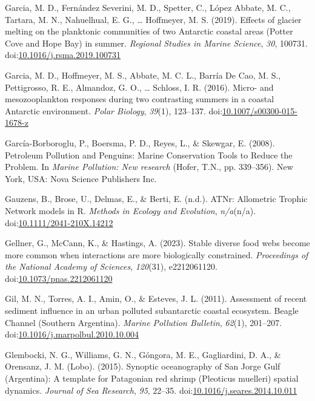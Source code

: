 \documentclass[
]{article}
\newlength{\cslhangindent}
\newenvironment{CSLReferences}[2] %
 {\begin{list}{}{%
  \setlength{\itemindent}{0pt}
  \setlength{\leftmargin}{0pt}
  \setlength{\parsep}{0pt}
  \ifodd #1
   \setlength{\leftmargin}{\cslhangindent}
   \setlength{\itemindent}{-1\cslhangindent}
  \fi
  \setlength{\itemsep}{#2\baselineskip}}}
 {\end{list}}
\begin{document}
\begin{CSLReferences}{1}{0}
Garcia, M. D., Fernández Severini, M. D., Spetter, C., López Abbate, M.
C., Tartara, M. N., Nahuelhual, E. G., \ldots{} Hoffmeyer, M. S. (2019).
Effects of glacier melting on the planktonic communities of two
{Antarctic} coastal areas ({Potter Cove} and {Hope Bay}) in summer.
\emph{Regional Studies in Marine Science}, \emph{30}, 100731.
doi:\href{https://doi.org/10.1016/j.rsma.2019.100731}{10.1016/j.rsma.2019.100731}

Garcia, M. D., Hoffmeyer, M. S., Abbate, M. C. L., Barría De Cao, M. S.,
Pettigrosso, R. E., Almandoz, G. O., \ldots{} Schloss, I. R. (2016).
Micro- and mesozooplankton responses during two contrasting summers in a
coastal {Antarctic} environment. \emph{Polar Biology}, \emph{39}(1),
123--137.
doi:\href{https://doi.org/10.1007/s00300-015-1678-z}{10.1007/s00300-015-1678-z}

García-Borboroglu, P., Boersma, P. D., Reyes, L., \& Skewgar, E. (2008).
Petroleum {Pollution} and {Penguins}: {Marine Conservation Tools} to
{Reduce} the {Problem}. In \emph{Marine {Pollution}: {New} research}
(Hofer, T.N., pp. 339--356). {New York, USA}: {Nova Science Publishers
Inc.}

Gauzens, B., Brose, U., Delmas, E., \& Berti, E. (n.d.). {ATNr}:
{Allometric Trophic Network} models in {R}. \emph{Methods in Ecology and
Evolution}, \emph{n/a}(n/a).
doi:\href{https://doi.org/10.1111/2041-210X.14212}{10.1111/2041-210X.14212}

Gellner, G., McCann, K., \& Hastings, A. (2023). Stable diverse food
webs become more common when interactions are more biologically
constrained. \emph{Proceedings of the National Academy of Sciences},
\emph{120}(31), e2212061120.
doi:\href{https://doi.org/10.1073/pnas.2212061120}{10.1073/pnas.2212061120}

Gil, M. N., Torres, A. I., Amin, O., \& Esteves, J. L. (2011).
Assessment of recent sediment influence in an urban polluted
subantarctic coastal ecosystem. {Beagle Channel} ({Southern Argentina}).
\emph{Marine Pollution Bulletin}, \emph{62}(1), 201--207.
doi:\href{https://doi.org/10.1016/j.marpolbul.2010.10.004}{10.1016/j.marpolbul.2010.10.004}

Glembocki, N. G., Williams, G. N., Góngora, M. E., Gagliardini, D. A.,
\& Orensanz, J. M. (Lobo). (2015). Synoptic oceanography of {San Jorge
Gulf} ({Argentina}): {A} template for {Patagonian} red shrimp
({Pleoticus} muelleri) spatial dynamics. \emph{Journal of Sea Research},
\emph{95}, 22--35.
doi:\href{https://doi.org/10.1016/j.seares.2014.10.011}{10.1016/j.seares.2014.10.011}


\end{CSLReferences}
\end{document}
